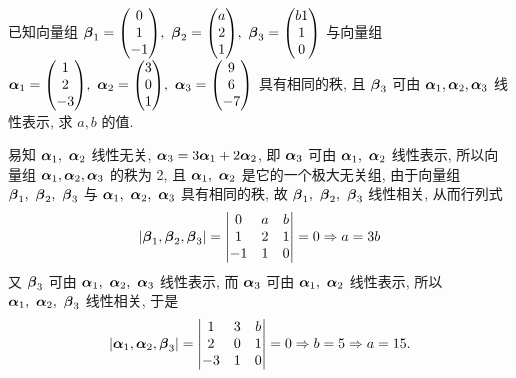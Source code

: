\begin{example}[2000 数二]
    已知向量组 $\vb*{\beta}_1=\mqty(0\\1\\-1),~\vb*{\beta}_2=\mqty(a\\2\\1),~\vb*{\beta}_3=\mqty(b1\\1\\0)$ 与向量组 $\vb*{\alpha}_1=\mqty(1\\2\\-3),\\~\vb*{\alpha}_2=\mqty(3\\0\\1),~\vb*{\alpha}_3=\mqty(9\\6\\-7)$ 具有相同的秩, 且 $\vb*{\beta}_3$ 可由 $\vb*{\alpha}_1,\vb*{\alpha}_2,\vb*{\alpha}_3$ 线性表示, 求 $a,b$ 的值.
\end{example}
\begin{solution}
    易知 $\vb*{\alpha}_1,~\vb*{\alpha}_2$ 线性无关, $\vb*{\alpha}_3=3\vb*{\alpha}_1+2\vb*{\alpha}_2$, 即 $\vb*{\alpha}_3$ 可由 $\vb*{\alpha}_1,~\vb*{\alpha}_2$ 线性表示, 所以向量组 $\vb*{\alpha}_1,\vb*{\alpha}_2,\vb*{\alpha}_3$ 的秩为 2, 且 $\vb*{\alpha}_1,~\vb*{\alpha}_2$ 是它的一个极大无关组, 
    由于向量组 $\vb*{\beta}_1,~\vb*{\beta}_2,~\vb*{\beta}_3$ 与 $\vb*{\alpha}_1,~\vb*{\alpha}_2,~\vb*{\alpha}_3$ 具有相同的秩, 故 $\vb*{\beta}_1,~\vb*{\beta}_2,~\vb*{\beta}_3$ 线性相关, 从而行列式 
    $$|\vb*{\beta}_1,\vb*{\beta}_2,\vb*{\beta}_3|=\mqty|0&a&b\\1&2&1\\-1&1&0|=0\Rightarrow a=3b$$
    又 $\vb*{\beta}_3$ 可由 $\vb*{\alpha}_1,~\vb*{\alpha}_2,~\vb*{\alpha}_3$ 线性表示, 而 $\vb*{\alpha}_3$ 可由 $\vb*{\alpha}_1,~\vb*{\alpha}_2$ 线性表示, 所以 $\vb*{\alpha}_1,~\vb*{\alpha}_2,~\vb*{\beta}_3$ 线性相关, 于是 
    $$|\vb*{\alpha}_1,\vb*{\alpha}_2,\vb*{\beta}_3|=\mqty|1&3&b\\2&0&1\\-3&1&0|=0\Rightarrow b=5\Rightarrow a=15.$$
\end{solution}

